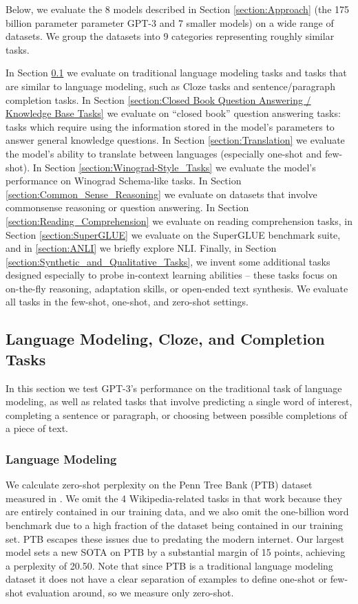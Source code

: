 \documentclass{article}
\begin{document}
Below, we evaluate the 8 models described in Section \ref{section:Approach} (the 175 billion parameter parameter GPT-3 and 7 smaller models) on a wide range of datasets. We group the datasets into 9 categories representing roughly similar tasks.  

In Section \ref{section:Language Modeling, Cloze, and Completion Tasks} we evaluate on traditional language modeling tasks and tasks that are similar to language modeling, such as Cloze tasks and sentence/paragraph completion tasks.  In Section \ref{section:Closed Book Question Answering / Knowledge Base Tasks} we evaluate on ``closed book'' question answering tasks: tasks which require using the information stored in the model’s parameters to answer general knowledge questions.  In Section \ref{section:Translation} we evaluate the model’s ability to translate between languages (especially one-shot and few-shot).  In Section \ref{section:Winograd-Style_Tasks} we evaluate the model’s performance on Winograd Schema-like tasks.  In Section \ref{section:Common_Sense_Reasoning} we evaluate on datasets that involve commonsense reasoning or question answering.  In Section \ref{section:Reading_Comprehension} we evaluate on reading comprehension tasks, in Section \ref{section:SuperGLUE} we evaluate on the SuperGLUE benchmark suite, and in \ref{section:ANLI} we briefly explore NLI.  Finally, in Section \ref{section:Synthetic_and_Qualitative_Tasks}, we invent some additional tasks designed especially to probe in-context learning abilities -- these tasks focus on on-the-fly reasoning, adaptation skills, or open-ended text synthesis. We evaluate all tasks in the few-shot, one-shot, and zero-shot settings.

    \subsection{Language Modeling, Cloze, and Completion Tasks}
    \label{section:Language Modeling, Cloze, and Completion Tasks}
In this section we test GPT-3’s performance on the traditional task of language modeling, as well as related tasks that involve predicting a single word of interest, completing a sentence or paragraph, or choosing between possible completions of a piece of text.

        \subsubsection{Language Modeling}
        \label{section:Language Modeling}
We calculate zero-shot perplexity on the Penn Tree Bank (PTB) \cite{marcus1994penn} dataset measured in \cite{radford2019language}. We omit the 4 Wikipedia-related tasks in that work because they are entirely contained in our training data, and we also omit the one-billion word benchmark due to a high fraction of the dataset being contained in our training set.  PTB escapes these issues due to predating the modern internet. Our largest model sets a new SOTA on PTB by a substantial margin of 15 points, achieving a perplexity of 20.50. Note that since PTB is a traditional language modeling dataset it does not have a clear separation of examples to define one-shot or few-shot evaluation around, so we measure only zero-shot.
\end{document}
